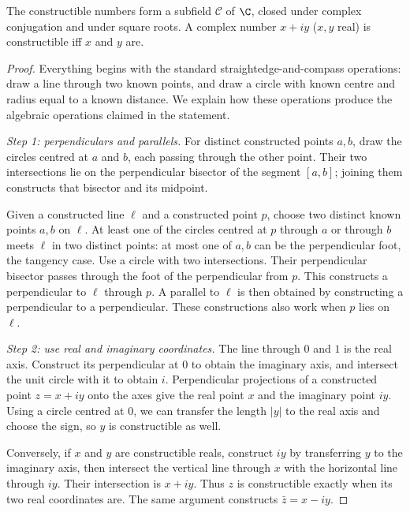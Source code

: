 \begin{proposition}\label{prop:constrfield}
The constructible numbers form a subfield $\mathcal C$ of $\C$, closed under complex conjugation and under square roots. A complex number $x+iy$ ($x,y$ real) is constructible iff $x$ and $y$ are.
\end{proposition}
\begin{proof}
Everything begins with the standard straightedge-and-compass
operations: draw a line through two known points, and draw
a circle with known centre and radius equal to a known
distance. We explain how these operations produce the
algebraic operations claimed in the statement.

\emph{Step 1: perpendiculars and parallels.}
For distinct constructed points $a,b$, draw
the circles centred at $a$ and $b$,
each passing through the other point.
Their two intersections lie on the
perpendicular bisector of the segment $[a,b]$;
joining them constructs that bisector
and its midpoint.

Given a constructed line $\ell$ and
a constructed point $p$, choose two distinct known points $a,b$ on $\ell$. At least one of
the circles centred at $p$ through $a$ or through $b$ meets $\ell$
in two distinct points: at most one of $a,b$ can be the perpendicular
foot, the tangency case. Use a circle with two intersections.
Their perpendicular bisector passes
through the foot of the perpendicular
from $p$. This constructs a perpendicular
to $\ell$ through $p$. A parallel to
$\ell$ is then obtained by constructing
a perpendicular to a perpendicular.
These constructions also work when
$p$ lies on $\ell$.

\emph{Step 2: use real and imaginary coordinates.}
The line through $0$ and $1$ is the real
axis. Construct its perpendicular at $0$
to obtain the imaginary axis, and intersect
the unit circle with it to obtain $i$.
Perpendicular projections of a constructed
point $z=x+iy$ onto the axes give the
real point $x$ and the imaginary point
$iy$. Using a circle centred at $0$,
we can transfer the length $|y|$ to
the real axis and choose the sign,
so $y$ is constructible as well.

Conversely, if $x$ and $y$ are
constructible reals, construct $iy$
by transferring $y$ to the imaginary
axis, then intersect the vertical line
through $x$ with the horizontal line
through $iy$. Their intersection is
$x+iy$. Thus $z$ is constructible
exactly when its two real coordinates are.
The same argument constructs
$\bar z=x-iy$.


\end{proof}
